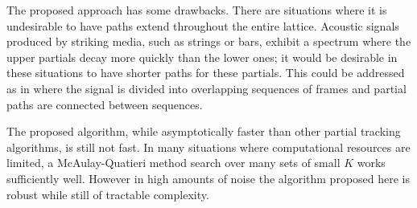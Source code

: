 \documentclass{article}
\begin{document}
\begin{sloppy}
The proposed approach has some drawbacks.
There are situations where it is undesirable to have paths extend
throughout the entire lattice. Acoustic signals produced by striking media, such
as strings or bars, exhibit a spectrum where the upper partials decay more
quickly than the lower ones; it
would be desirable in these situations to have shorter paths for these
partials. This could be addressed as in
\cite{depalle1993tracking} where the signal is divided into overlapping sequences of
frames and partial paths are connected between sequences.

The proposed algorithm, while asymptotically faster than other partial tracking
algorithms, is still not fast. In many situations where computational resources
are limited, a McAulay-Quatieri method search over many sets of small $K$ works
sufficiently well. However in high amounts of noise the algorithm proposed here
is robust while still of tractable complexity.






\end{sloppy}
\end{document}

